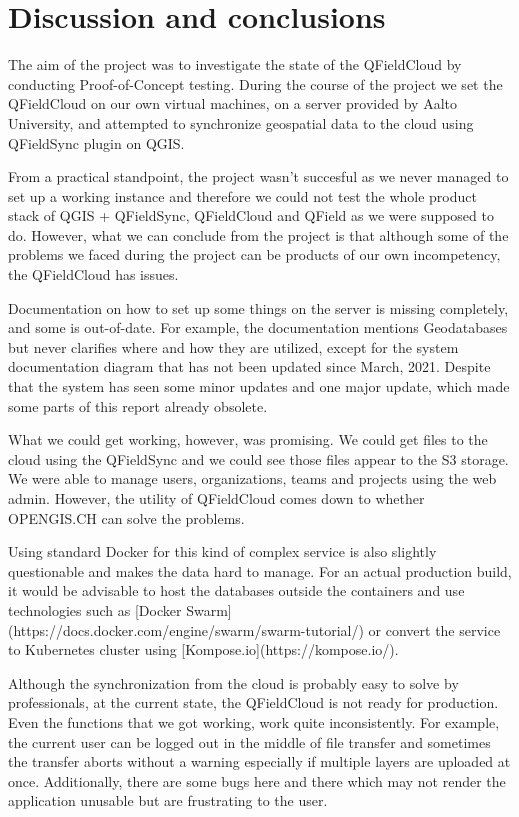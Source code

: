 \documentclass{article}
\begin{document}
\section{Discussion and conclusions}
The aim of the project was to investigate the state of the QFieldCloud by conducting Proof-of-Concept testing. During the course of the project we set the QFieldCloud on our own virtual machines, on a server provided by Aalto University, and attempted to synchronize geospatial data to the cloud using QFieldSync plugin on QGIS. 

From a practical standpoint, the project wasn't succesful as we never managed to set up a working instance and therefore we could not test the whole product stack of QGIS + QFieldSync, QFieldCloud and QField as we were supposed to do. However, what we can conclude from the project is that although some of the problems we faced during the project can be products of our own incompetency, the QFieldCloud has issues. 

Documentation on how to set up some things on the server is missing completely, and some is out-of-date. For example, the documentation mentions Geodatabases but never clarifies where and how they are utilized, except for the system documentation diagram that has not been updated since March, 2021. Despite that the system has seen some minor updates and one major update, which made some parts of this report already obsolete.

What we could get working, however, was promising. We could get files to the cloud using the QFieldSync and we could see those files appear to the S3 storage. We were able to manage users, organizations, teams and projects using the web admin. However, the utility of QFieldCloud comes down to whether OPENGIS.CH can solve the problems.

\begin{markdown}
Using standard Docker for this kind of complex service is also slightly questionable and makes the data hard to manage. For an actual production build, it would be advisable to host the databases outside the containers and use technologies such as [Docker Swarm](https://docs.docker.com/engine/swarm/swarm-tutorial/) or convert the service to Kubernetes cluster using [Kompose.io](https://kompose.io/). 
\end{markdown}

Although the synchronization from the cloud is probably easy to solve by professionals, at the current state, the QFieldCloud is not ready for production. Even the functions that we got working, work quite inconsistently. For example, the current user can be logged out in the middle of file transfer and sometimes the transfer aborts without a warning especially if multiple layers are uploaded at once. Additionally, there are some bugs here and there which may not render the application unusable but are frustrating to the user.     



\end{document}
